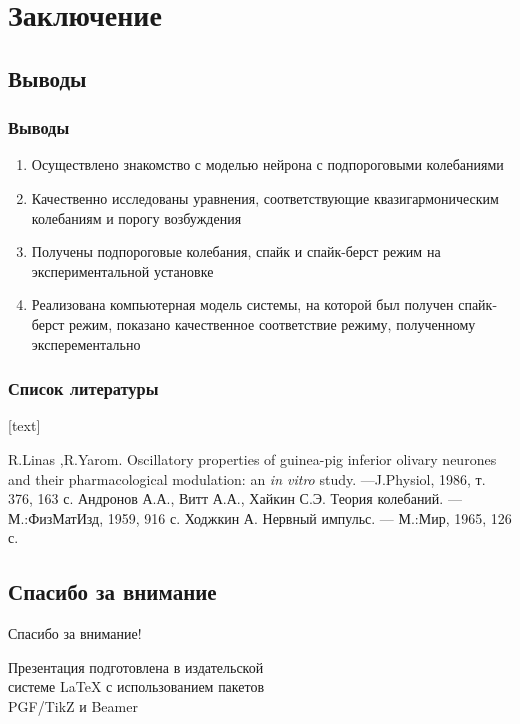 \section{Заключение}
\subsection{Выводы}
\begin{frame}
	\frametitle{Выводы}
	\begin{enumerate}
		\item Осуществлено знакомство с моделью нейрона с подпороговыми колебаниями
		\item Качественно исследованы уравнения, соответствующие квазигармоническим колебаниям и порогу возбуждения
		\item Получены подпороговые колебания, спайк и спайк-берст режим на экспериментальной установке
		\item Реализована компьютерная модель системы, на которой был получен спайк-берст режим, показано качественное соответствие режиму, полученному эксперементально
	\end{enumerate}
\end{frame}
\begin{frame}[plain]
	\frametitle{Список литературы}
	[text]
	\begin{thebibliography}{3}
		R.Linas ,R.Yarom. Oscillatory properties of guinea-pig inferior olivary neurones and their pharmacological modulation: an \textit{in vitro} study. ---J.Physiol, 1986, т. 376, 163 с.
		Андронов А.А., Витт А.А., Хайкин С.Э. Теория колебаний. --- М.:ФизМатИзд, 1959, 916 с.
		Ходжкин А. Нервный импульс. --- М.:Мир, 1965, 126 с.
	\end{thebibliography}
\end{frame}
\subsection{Спасибо за внимание}
\begin{frame}[plain]
	\vspace{4cm}
	\begin{center}
		\Huge
		Спасибо за внимание!
	\end{center}
	\vspace{2.5cm}
	\begin{center}
		\color{black!60!white}
		Презентация подготовлена в издательской \\
		системе LaTeX с использованием пакетов \\
		PGF/TikZ и Beamer
	\end{center}
\end{frame}
